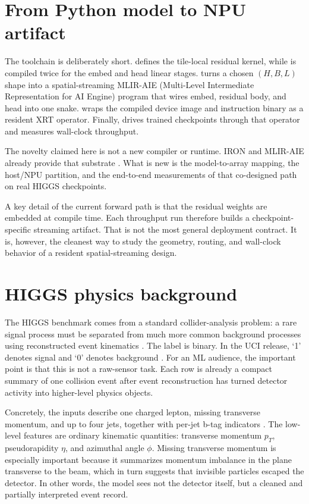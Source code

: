 \documentclass[a4paper,11pt]{article}
\begin{document}
\section{From Python model to NPU artifact}
\label{app:python-to-artifact}

The toolchain is deliberately short. 
defines the tile-local residual kernel, while
 is compiled twice for the embed and head
linear stages.  turns a chosen $(H, B, L)$
shape into a spatial-streaming MLIR-AIE (Multi-Level Intermediate
Representation for AI Engine) program that wires embed, residual
body, and head into one snake.  wraps the compiled
device image and instruction binary as a resident XRT operator. Finally,
 drives trained checkpoints through that
operator and measures wall-clock throughput.

The novelty claimed here is not a new compiler or runtime. IRON and MLIR-AIE
already provide that substrate \cite{iron,mlir-aie}. What is new is the
model-to-array mapping, the host/NPU partition, and the end-to-end measurements
of that co-designed path on real HIGGS checkpoints.

A key detail of the current forward path is that the residual weights are
embedded at compile time. Each throughput run therefore builds a
checkpoint-specific streaming artifact. That is not the most general
deployment contract. It is, however, the cleanest way to study the geometry,
routing, and wall-clock behavior of a resident spatial-streaming design.

\FloatBarrier
\clearpage
\section{HIGGS physics background}

The HIGGS benchmark comes from a standard collider-analysis problem: a rare
signal process must be separated from much more common background processes
using reconstructed event kinematics \cite{baldi-higgs}. The label is binary.
In the UCI release, `1' denotes signal and `0' denotes background
\cite{uci-higgs}. For an ML audience, the important point is that this is not a
raw-sensor task. Each row is already a compact summary of one collision event
after event reconstruction has turned detector activity into higher-level
physics objects.

Concretely, the inputs describe one charged lepton, missing transverse
momentum, and up to four jets, together with per-jet b-tag indicators
\cite{uci-higgs}. The low-level features are ordinary kinematic quantities:
transverse momentum $p_T$, pseudorapidity $\eta$, and azimuthal angle $\phi$.
Missing transverse momentum is especially important because it summarizes
momentum imbalance in the plane transverse to the beam, which in turn suggests
that invisible particles escaped the detector. In other words, the model sees
not the detector itself, but a cleaned and partially interpreted event record.
\end{document}
